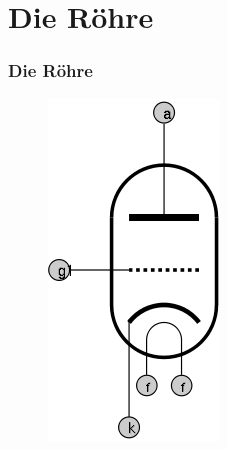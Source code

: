 \begin{frame}
\begin{minipage}{0.5\textwidth}
\begin{center}
\begin{figure}
      \end{figure}
    \end{center}
  \end{minipage}
\end{frame}

\section*{Die Röhre}
\begin{frame}
  \frametitle{Die Röhre}
  \begin{minipage}{0.3\textwidth}
    \begin{figure}
      \includegraphics[width=\textwidth,height=.5\textheight,keepaspectratio]{e13/ERohre.png}

\end{figure}
\end{minipage}
\end{frame}
